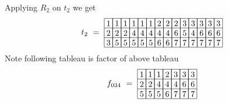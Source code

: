 {Applying \(R_2\) on \(t_2\) we get
\begin{align*}
{\def\lr#1{\multicolumn{1}{|@{\hspace{.6ex}}c@{\hspace{.6ex}}|}{\raisebox{-.3ex}{$#1$}}}
\raisebox{-.6ex}{$t_2\ =\ \begin{array}[c]{*{14}c}\cline{1-14}
\lr{1}&\lr{1}&\lr{1}&\lr{1}&\lr{1}&\lr{1}&\lr{2}&\lr{2}&\lr{2}&\lr{3}&\lr{3}&\lr{3}&\lr{3}&\lr{3}\\\cline{1-14}
\lr{2}&\lr{2}&\lr{2}&\lr{4}&\lr{4}&\lr{4}&\lr{4}&\lr{4}&\lr{6}&\lr{5}&\lr{4}&\lr{6}&\lr{6}&\lr{6}\\\cline{1-14}
\lr{3}&\lr{5}&\lr{5}&\lr{5}&\lr{5}&\lr{5}&\lr{6}&\lr{6}&\lr{7}&\lr{7}&\lr{7}&\lr{7}&\lr{7}&\lr{7}\\\cline{1-14}
\end{array}$}
}
\end{align*}
Note following tableau is factor of above tableau
\[
{\def\lr#1{\multicolumn{1}{|@{\hspace{.6ex}}c@{\hspace{.6ex}}|}{\raisebox{-.3ex}{$#1$}}}
\raisebox{-.6ex}{$f_{034}\ =\ \begin{array}[c]{*{7}c}\cline{1-7}
\lr{1}&\lr{1}&\lr{1}&\lr{2}&\lr{3}&\lr{3}&\lr{3}\\\cline{1-7}
\lr{2}&\lr{2}&\lr{4}&\lr{4}&\lr{4}&\lr{6}&\lr{6}\\\cline{1-7}
\lr{5}&\lr{5}&\lr{5}&\lr{6}&\lr{7}&\lr{7}&\lr{7}\\\cline{1-7}
\end{array}$}
}
\]

}
